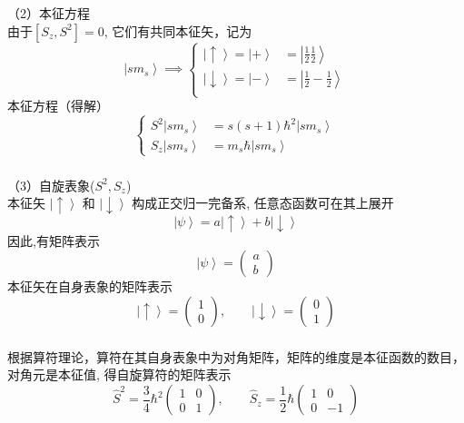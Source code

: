 \begin{frame}[label=current]
  \frametitle{}
（2）本征方程 \\

由于$[S_z, S^2] =0$, 它们有共同本征矢，记为
$$\left\vert sm_s  \right\rangle \implies \left\{\begin{aligned}
  \left\vert \uparrow \right\rangle = \left\vert +\right\rangle &= \left\vert \frac{1}{2}\frac{1}{2} \right\rangle \\ 
  \left\vert \downarrow \right\rangle = \left\vert - \right\rangle &= \left\vert \frac{1}{2}-\frac{1}{2} \right\rangle \\ 
\end{aligned} \right.$$
本征方程（得解）
$$\left\{\begin{aligned}
  S^2 \left\vert sm_s \right\rangle &= s(s+1)\hbar^2\left\vert sm_s \right\rangle \\ 
  S_z \left\vert sm_s \right\rangle &= m_s\hbar \left\vert sm_s \right\rangle 
\end{aligned} \right.$$
\end{frame} 

\begin{frame}[label=current]
  \frametitle{}
  （3）自旋表象($S^2,S_z$) \\
  本征矢 $\left\vert \uparrow \right\rangle$ 和 $\left\vert \downarrow \right\rangle$ 构成正交归一完备系, 任意态函数可在其上展开
  \[ \left\vert \psi \right\rangle = a  \left\vert \uparrow \right\rangle + b \left\vert \downarrow \right\rangle\]
  因此,有矩阵表示
  \[ \left\vert \psi \right\rangle = \begin{pmatrix}
   a\\
   b
  \end{pmatrix}\]
  本征矢在自身表象的矩阵表示
  \[ \left\vert \uparrow \right\rangle = \begin{pmatrix}
    1\\
    0
   \end{pmatrix}, \qquad \left\vert \downarrow \right\rangle = \begin{pmatrix}
    0\\
    1
   \end{pmatrix}\]
\end{frame} 

\begin{frame}[label=current]
  \frametitle{}
  根据算符理论，算符在其自身表象中为对角矩阵，矩阵的维度是本征函数的数目，对角元是本征值, 得自旋算符的矩阵表示
  \[\hat{S}^2 = \frac{3}{4}\hbar^2\begin{pmatrix}
    1 & 0\\
    0 & 1
   \end{pmatrix}, \qquad \hat{S}_z = \frac{1}{2}\hbar\begin{pmatrix}
    1 & 0\\
    0 & -1
   \end{pmatrix}\]
\end{frame} 

